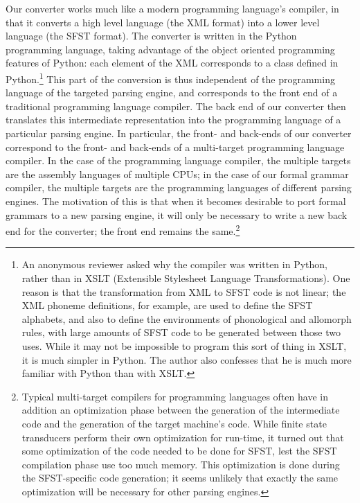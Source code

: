 Our converter works much like a modern programming language's compiler, in that it converts a high level language (the XML format) into a lower level language (the SFST format). The converter is written in the Python programming language, taking advantage of the object oriented programming features of Python: each element of the XML corresponds to a class defined in Python.\footnote{An
  anonymous reviewer asked why the compiler was written in Python, rather than in XSLT (Extensible Stylesheet Language Transformations). One reason is that the transformation from XML to SFST code is not linear; the XML phoneme definitions, for example, are used to define the SFST alphabets, and also to define the environments of phonological and allomorph rules, with large amounts of SFST code to be generated between those two uses. While it may not be impossible to program this sort of thing in XSLT, it is much simpler in Python. The author also confesses that he is much more familiar with Python than with XSLT.} This part of the conversion is thus independent of the programming language of the targeted parsing engine, and corresponds to the front end of a traditional programming language compiler. The back end of our converter then translates this intermediate representation into the programming language of a particular parsing engine. In particular, the front- and back-ends of our converter correspond to the front- and back-ends of a multi-target programming language compiler. In the case of the programming language compiler, the multiple targets are the assembly languages of multiple CPUs; in the case of our formal grammar compiler, the multiple targets are the programming languages of different parsing engines. The motivation of this is that when it becomes desirable to port formal grammars to a new parsing engine, it will only be necessary to write a new back end for the converter; the front end remains the same.\footnote{Typical
  multi-target compilers for programming languages often have in addition an optimization phase between the generation of the intermediate code and the generation of the target machine's code. While finite state transducers perform their own optimization for run-time, it turned out that some optimization of the code needed to be done for SFST, lest the SFST compilation phase use too much memory. This optimization is done during the SFST-specific code generation; it seems unlikely that exactly the same optimization will be necessary for other parsing engines.}

